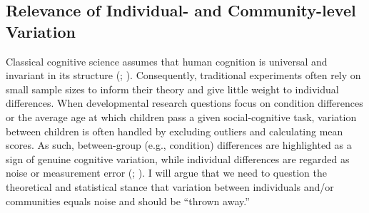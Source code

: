 \documentclass[
]{scrbook}
\begin{document}
\subsection{Relevance of Individual- and Community-level Variation}\label{relevance-of-individual--and-community-level-variation}

Classical cognitive science assumes that human cognition is universal and invariant in its structure (; ). Consequently, traditional experiments often rely on small sample sizes to inform their theory and give little weight to individual differences. When developmental research questions focus on condition differences or the average age at which children pass a given social-cognitive task, variation between children is often handled by excluding outliers and calculating mean scores. As such, between-group (e.g., condition) differences are highlighted as a sign of genuine cognitive variation, while individual differences are regarded as noise or measurement error (; ). I will argue that we need to question the theoretical and statistical stance that variation between individuals and/or communities equals noise and should be ``thrown away.''
\end{document}
